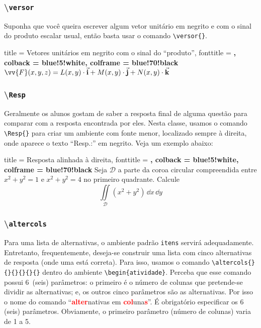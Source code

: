 \subsubsection*{\textbackslash \texttt{versor}} %
%
Suponha que você queira escrever algum vetor unitário em negrito e com o sinal 
do produto escalar usual, então basta usar o comando \verb|\versor{}|.

\begin{tcblisting}
{
  title     = Vetores unitários em negrito com o sinal do ``produto'',
  fonttitle = \bfseries,
  colback   = blue!5!white,
  colframe  = blue!70!black 
}
$\vv{F}(x,y,z)=L(x,y)\versor{i}+M(x,y)\versor{j}+N(x,y)\versor{k}$
\end{tcblisting}
%
\subsubsection*{\textbackslash \texttt{Resp}} %
%
Geralmente os alunos gostam de saber a resposta final de alguma questão para 
comparar com a resposta encontrada por eles.
Nesta classe, usamos o comando \verb|\Resp{}| para criar um ambiente com fonte 
menor, localizado sempre à direita, onde aparece o texto ``Resp.:'' em negrito.
Veja um exemplo abaixo:

\begin{tcblisting}
{
  title     = Resposta alinhada à direita,
  fonttitle = \bfseries,
  colback   = blue!5!white,
  colframe  = blue!70!black
}
Seja $\mathcal{D}$ a parte da coroa circular compreendida entre $x^2+y^2=1$ e $x^2+y^2=4$ no primeiro quadrante.
Calcule 
\[
  \iint\limits_{\mathcal{D}}(x^2+y^2)\,\dd{x}\,\dd{y}
\]
\end{tcblisting}
%
\subsubsection*{\textbackslash \texttt{altercols}} %
%
Para uma lista de alternativas, o ambiente padrão \texttt{itens} servirá 
adequadamente.
Entretanto, frequentemente, deseja-se construir uma lista com cinco alternativas
de resposta (onde uma está correta).
Para isso, usamos o comando \verb|\altercols{}{}{}{}{}{}| dentro do ambiente
\verb|\begin{atividade}|.
Perceba que esse comando possui 6~(seis) parâmetros: o primeiro é o número de 
colunas que pretende-se dividir as alternativas; e, os outros cinco parâmetros 
são as alternativas.
Por isso o nome do comando ``\textcolor{red}{\textbf{alter}}nativas em 
\textcolor{red}{\textbf{col}}una\textcolor{red}{\textbf{s}}''.
É obrigatório especificar os 6 (seis) parâmetros.
Obviamente, o primeiro parâmetro (número de colunas) varia de 1 a 5.

